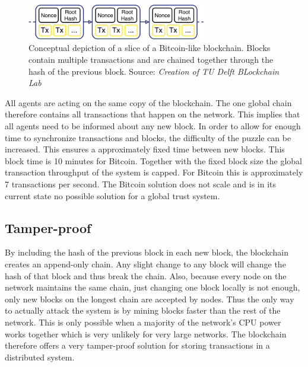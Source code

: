 \begin{figure}
    \centering
    \includegraphics[width=0.7\textwidth]{images/blockchain}
    \caption{Conceptual depiction of a slice of a Bitcoin-like blockchain. Blocks contain multiple transactions and are chained together through the hash of the previous block. Source: \textit{Creation of TU Delft BLockchain Lab}}
    \label{fig:basic_blockchain}
\end{figure}

All agents are acting on the same copy of the blockchain. The one global chain therefore contains 
all transactions that happen on the network. This implies that all agents need to be informed about any new block.
In order to allow for enough time to synchronize transactions and blocks, the difficulty of the puzzle 
can be increased. This ensures a approximately fixed time between new blocks. This block time is 
10 minutes for Bitcoin. Together with the fixed block size the global transaction throughput of the
system is capped. For Bitcoin this is approximately 7 transactions per second. The Bitcoin solution
does not scale and is in its current state no possible solution for a global trust system.

\subsection{Tamper-proof}
By including the hash of the previous block in each new block, the blockchain creates an append-only
chain. Any slight change to any block will change the hash of that block and thus break the chain. 
Also, because every node on the network maintains the same chain, just changing one block locally 
is not enough, only new blocks on the longest chain are accepted by nodes. Thus the only way to 
actually attack the system is by mining blocks faster than the rest of the network. This is only 
possible when a majority of the network's CPU power works together which is very unlikely for very
large networks. The blockchain therefore offers a very tamper-proof solution for storing transactions
in a distributed system.

